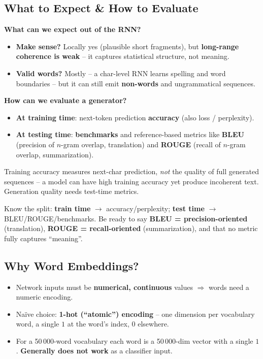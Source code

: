 \documentclass[10pt,a4paper]{article}
\begin{document}
	\subsection{What to Expect \& How to Evaluate}

	\textbf{What can we expect out of the RNN?}
	\begin{itemize}[leftmargin=*]
		\item \textbf{Make sense?} Locally yes (plausible short fragments), but \textbf{long-range coherence is weak} -- it captures statistical structure, not meaning.
		\item \textbf{Valid words?} Mostly -- a char-level RNN learns spelling and word boundaries -- but it can still emit \textbf{non-words} and ungrammatical sequences.
	\end{itemize}

	\textbf{How can we evaluate a generator?}
	\begin{itemize}[leftmargin=*]
		\item \textbf{At training time}: next-token prediction \textbf{accuracy} (also loss / perplexity).
		\item \textbf{At testing time}: \textbf{benchmarks} and reference-based metrics like \textbf{BLEU} (precision of $n$-gram overlap, translation) and \textbf{ROUGE} (recall of $n$-gram overlap, summarization).
	\end{itemize}

	\begin{importantbox}
		Training accuracy measures next-char prediction, \emph{not} the quality of full generated sequences -- a model can have high training accuracy yet produce incoherent text. Generation quality needs test-time metrics.
	\end{importantbox}

	\begin{examtipbox}
		Know the split: \textbf{train time} $\rightarrow$ accuracy/perplexity; \textbf{test time} $\rightarrow$ BLEU/ROUGE/benchmarks. Be ready to say \textbf{BLEU = precision-oriented} (translation), \textbf{ROUGE = recall-oriented} (summarization), and that no metric fully captures ``meaning''.
	\end{examtipbox}

	\subsection{Why Word Embeddings?}

	\begin{itemize}[leftmargin=*]
		\item Network inputs must be \textbf{numerical, continuous} values $\Rightarrow$ words need a numeric encoding.
		\item Naïve choice: \textbf{1-hot (``atomic'') encoding} -- one dimension per vocabulary word, a single $1$ at the word's index, $0$ elsewhere.
		\item For a 50\,000-word vocabulary each word is a 50\,000-dim vector with a single $1$. \textbf{Generally does not work} as a classifier input.
	\end{itemize}
\end{document}
